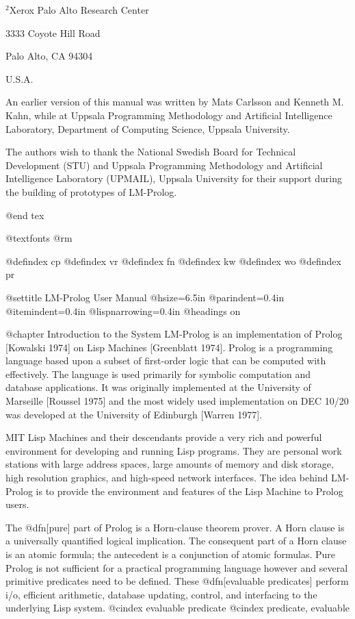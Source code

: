 {\vfill

\centerline{$^2$Xerox Palo Alto Research Center}
\centerline{3333 Coyote Hill Road}
\centerline{Palo Alto, CA 94304}
\centerline{U.S.A.}

\vfill

An earlier version of this manual was written by Mats Carlsson and
Kenneth M. Kahn, while at Uppsala Programming Methodology and
Artificial Intelligence Laboratory, Department of Computing Science,
Uppsala University.

The authors wish to thank the National Swedish Board for
Technical Development (STU) and Uppsala Programming Methodology and Artificial
Intelligence Laboratory (UPMAIL), Uppsala University for their support during 
the building of prototypes of LM-Prolog.

\eject

@end tex

@textfonts 
@rm

@defindex cp
@defindex vr
@defindex fn
@defindex kw
@defindex wo
@defindex pr

@settitle LM-Prolog User Manual
@hsize=6.5in
@parindent=0.4in
@itemindent=0.4in
@lispnarrowing=0.4in
@headings on

@chapter Introduction to the System
LM-Prolog is an implementation of Prolog [Kowalski 1974] on Lisp
Machines [Greenblatt 1974].  Prolog is a programming language based
upon a subset of first-order logic that can be computed with
effectively.  The language is used primarily for symbolic computation
and database applications.  It was originally implemented at the
University of Marseille [Roussel 1975] and the most widely used
implementation on DEC 10/20 was developed at the University of
Edinburgh [Warren 1977].

MIT Lisp Machines and their descendants provide a very rich and
powerful environment for developing and running Lisp programs.  They
are personal work stations with large address spaces, large amounts of
memory and disk storage, high resolution graphics, and high-speed
network interfaces.  The idea behind LM-Prolog is to provide the
environment and features of the Lisp Machine to Prolog users.

The @dfn[pure] part of Prolog is a Horn-clause theorem prover.  A Horn
clause is a universally quantified logical implication.  The
consequent part of a Horn clause is an atomic formula; the antecedent
is a conjunction of atomic formulas.  Pure Prolog is not sufficient
for a practical programming language however and several primitive
predicates need to be defined.  These @dfn[evaluable predicates] perform
i/o, efficient arithmetic, database updating, control, and interfacing
to the underlying Lisp system.
@cindex evaluable predicate
@cindex predicate, evaluable

}
